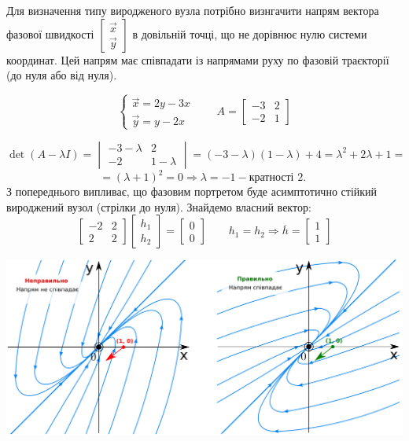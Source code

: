 Для визначення типу виродженого вузла потрібно визнгачити напрям вектора фазової швидкості $ \begin{bmatrix}
 \vec{x} \\
 \vec{y}
\end{bmatrix}$ в довільній точці, що не дорівнює нулю системи координат. Цей напрям має співпадати із напрямами руху по фазовій траєкторії (до нуля або від нуля).

\begin{example}
    $$
    \begin{cases}
        \vec{x} = 2y - 3x\\
        \vec{y} = y - 2x
    \end{cases} \qquad A = \begin{bmatrix}
     -3 & 2 \\
     -2 & 1
    \end{bmatrix}
    $$

    $$
    \det{ \left( A - \lambda I  \right) } = \begin{vmatrix}
      -3 - \lambda & 2 \\
      -2 & 1 - \lambda
    \end{vmatrix} = ( -3 - \lambda ) ( 1 -\lambda) + 4 =  \lambda^2 + 2 \lambda + 1 =
    $$
    $$
    = ( \lambda+ 1) ^2 = 0 \Longrightarrow  \lambda = -1 - \text{кратності 2. }
    $$
З попереднього випливає, що фазовим портретом буде асимптотично стійкий вироджений вузол (стрілки до нуля).
Знайдемо власний вектор:
$$
\begin{bmatrix}
 -2 & 2 \\
 2 & 2
\end{bmatrix} \begin{bmatrix}
 h_1 \\
 h_2
\end{bmatrix} = \begin{bmatrix}
 0 \\
 0
\end{bmatrix} \qquad h_1 = h_2 \Rightarrow \overline{h} = \begin{bmatrix}
 1 \\
 1
\end{bmatrix}
$$

\begin{center} \includegraphics[scale=0.3]{assets/lectures_recent-f0de3cfc.png} \end{center}


\end{example}
